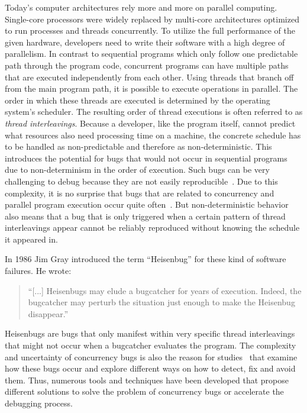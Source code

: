 \documentclass[english]{lni}
\begin{document}
Today's computer architectures rely more and more on parallel computing.
Single-core processors were widely replaced by multi-core architectures optimized to run processes and threads concurrently.
To utilize the full performance of the given hardware, developers need to write their software with a high degree of parallelism.
In contrast to sequential programs which only follow one predictable path through the program code, concurrent programs can have multiple paths that are executed independently from each other.
Using threads that branch off from the main program path, it is possible to execute operations in parallel.
The order in which these threads are executed is determined by the operating system's scheduler.
The resulting order of thread executions is often referred to as \emph{thread interleavings}.
Because a developer, like the program itself, cannot predict what resources also need processing time on a machine, the concrete schedule has to be handled as non-predictable and therefore as non-deterministic.
This introduces the potential for bugs that would not occur in sequential programs due to non-determinism in the order of execution.
Such bugs can be very challenging to debug because they are not easily reproducible~\cite{tu2019go}.
Due to this complexity, it is no surprise that bugs that are related to concurrency and parallel program execution occur quite often~\cite{lu2008mistakes}.
But non-deterministic behavior also means that a bug that is only triggered when a certain pattern of thread interleavings appear cannot be reliably reproduced without knowing the schedule it appeared in.

In 1986 Jim Gray introduced the term ``Heisenbug'' for these kind of software failures.
He wrote:

\begin{quote}
``[...] Heisenbugs may elude a bugcatcher for years of execution. Indeed, the bugcatcher may perturb the situation just enough to make the Heisenbug disappear.''\cite{gray1986computers}
\end{quote}

Heisenbugs are bugs that only manifest within very specific thread interleavings that might not occur when a bugcatcher evaluates the program.
The complexity and uncertainty of concurrency bugs is also the reason for studies~\cite{tu2019go} that examine how these bugs occur and explore different ways on how to detect, fix and avoid them.
Thus, numerous tools and techniques have been developed that propose different solutions to solve the problem of concurrency bugs or accelerate the debugging process.
\end{document}
